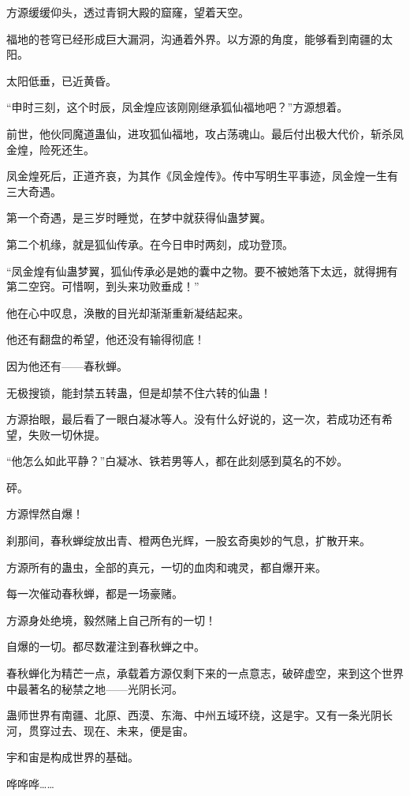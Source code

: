 
\begin{this_body}

方源缓缓仰头，透过青铜大殿的窟窿，望着天空。

福地的苍穹已经形成巨大漏洞，沟通着外界。以方源的角度，能够看到南疆的太阳。

太阳低垂，已近黄昏。

“申时三刻，这个时辰，凤金煌应该刚刚继承狐仙福地吧？”方源想着。

前世，他伙同魔道蛊仙，进攻狐仙福地，攻占荡魂山。最后付出极大代价，斩杀凤金煌，险死还生。

凤金煌死后，正道齐哀，为其作《凤金煌传》。传中写明生平事迹，凤金煌一生有三大奇遇。

第一个奇遇，是三岁时睡觉，在梦中就获得仙蛊梦翼。

第二个机缘，就是狐仙传承。在今日申时两刻，成功登顶。

“凤金煌有仙蛊梦翼，狐仙传承必是她的囊中之物。要不被她落下太远，就得拥有第二空窍。可惜啊，到头来功败垂成！”

他在心中叹息，涣散的目光却渐渐重新凝结起来。

他还有翻盘的希望，他还没有输得彻底！

因为他还有——春秋蝉。

无极搜锁，能封禁五转蛊，但是却禁不住六转的仙蛊！

方源抬眼，最后看了一眼白凝冰等人。没有什么好说的，这一次，若成功还有希望，失败一切休提。

“他怎么如此平静？”白凝冰、铁若男等人，都在此刻感到莫名的不妙。

砰。

方源悍然自爆！

刹那间，春秋蝉绽放出青、橙两色光辉，一股玄奇奥妙的气息，扩散开来。

方源所有的蛊虫，全部的真元，一切的血肉和魂灵，都自爆开来。

每一次催动春秋蝉，都是一场豪赌。

方源身处绝境，毅然赌上自己所有的一切！

自爆的一切。都尽数灌注到春秋蝉之中。

春秋蝉化为精芒一点，承载着方源仅剩下来的一点意志，破碎虚空，来到这个世界中最著名的秘禁之地——光阴长河。

蛊师世界有南疆、北原、西漠、东海、中州五域环绕，这是宇。又有一条光阴长河，贯穿过去、现在、未来，便是宙。

宇和宙是构成世界的基础。

哗哗哗……


\end{this_body}
